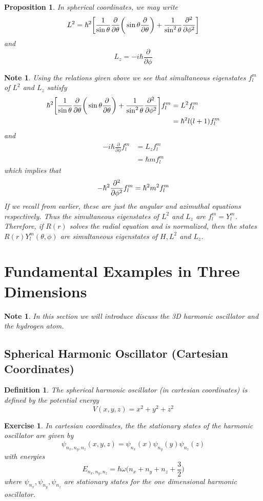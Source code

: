 \documentclass[12pt]{amsart}
\newtheorem{prop}[thm]{Proposition}
\newtheorem{defn}[thm]{Definition}
\newtheorem{note}[thm]{Note}
\newtheorem{ex}[thm]{Exercise}
\newcommand{\om}{\omega}
\newcommand{\p}[1]{\frac{\partial}{\partial{#1}}}
\begin{document}
\begin{prop}
In spherical coordinates, we may write $$L^2 = \hbar^2\bigg[ \frac{1}{\sin \theta }\p{\theta} \bigg( \sin \theta \p{\theta} \bigg) + \frac{1}{\sin^2 \theta} \pdv[2]{}{\phi}\bigg]$$ and $$L_z = -i\hbar \p{\phi}$$
\end{prop}

\begin{note}
Using the relations given above we see that simultaneous eigenstates $f_l^m$ of $L^2$ and $L_z$ satisfy 
\begin{align*}
\hbar^2\bigg[ \frac{1}{\sin \theta }\p{\theta} \bigg( \sin \theta \p{\theta} \bigg) + \frac{1}{\sin^2 \theta} \pdv[2]{}{\phi}\bigg] f_l^m 
&= L^2 f_l^m \\
&= \hbar^2 l(l+1) f_l^m 
\end{align*}
and 
\begin{align*}
-i \hbar \p{\phi} f_l^m 
&= L_z f_l^m \\
&= \hbar m f_l^m 
\end{align*}
which implies that $$-\hbar^2 \pdv[2]{}{\phi}f_l^m  = \hbar^2 m^2 f_l^m $$
If we recall from earlier, these are just the angular and azimuthal equations respectively. Thus the simultaneous eigenstates of $L^2$ and $L_z$ are $f_l^m = Y_l^m$. Therefore, if $R(r)$ solves the radial equation and is normalized, then the states $R(r)Y_l^m(\theta, \phi)$ are simultaneous eigenstates of $H, L^2$ and $L_z$.
\end{note}
\newpage

\section{Fundamental Examples in Three Dimensions}
\begin{note}
In this section we will introduce discuss the 3D harmonic oscillator and the hydrogen atom.
\end{note}

\subsection{Spherical Harmonic Oscillator (Cartesian Coordinates)}

\begin{defn}
The spherical harmonic oscillator (in cartesian coordinates) is defined by the potential energy
$$V(x,y,z) = x^2 + y^2 + z^2$$
\end{defn}

\begin{ex}
In cartesian coordinates, the the stationary states of the harmonic oscillator are given by $$\psi_{n_x, n_y, n_z}(x,y,z) = \psi_{n_x}(x)\psi_{n_y}(y)\psi_{n_z}(z)$$ with energies $$E_{n_x,n_y, n_z} = \hbar \om \bigg (n_x + n_y + n_z + \frac{3}{2} \bigg)$$ where $\psi_{n_x}, \psi_{n_y}, \psi_{n_z}$ are stationary states for the one dimensional harmonic oscillator.
\end{ex}
\end{document}
